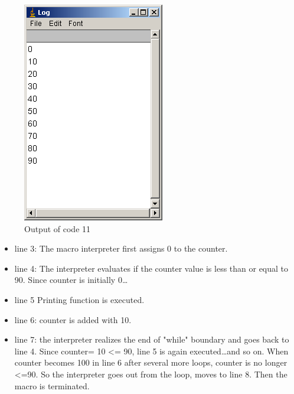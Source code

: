 \documentclass[11pt,a4paper,oneside]{report}
\begin{document}
\begin{figure}[htbp]
\begin{center}
\includegraphics[scale=0.4]{fig/fig2331_Code11out.png}
\caption{Output of code 11}
\label{fig:code11 output}
\end{center}
\end{figure} 

\begin{itemize}
\item line 3: The macro interpreter first assigns 0 to the counter.
\item line 4: The interpreter evaluates if the counter value is less than or equal to 90. Since counter is initially 0\ldots 
\item line 5 Printing function is executed. 
\item line 6: counter is added with 10. 
\item line 7: the interpreter realizes the end of "while" boundary and goes back to line 4. Since counter= 10 <= 90, line 5 is again executed\ldots and so on. When counter becomes 100 in line 6 after several more loops, counter is no longer <=90. So the interpreter goes out from the loop, moves to line 8. Then the macro is terminated.
\end{itemize}
\end{document}
